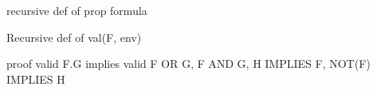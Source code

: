
recursive def of prop formula

Recursive def of val(F, env)

proof valid F.G implies valid F OR G, F AND G, H IMPLIES F, NOT(F) IMPLIES H
